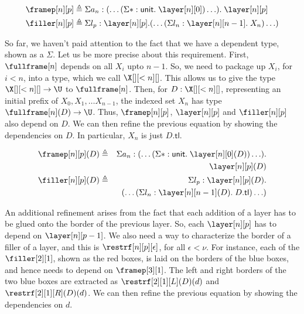 \documentclass[10pt]{art.cls/art}
\newcommand{\unittype}{\ensuremath{\mathsf{unit}}}
\newcommand{\unitpoint}{\ensuremath{\ast}}
\newcommand{\defeq}{\ensuremath{\triangleq}}
\newcommand{\tl}{\ensuremath{\mathsf{tl}}}
\begin{document}
\begin{align*}
  \framep[n][p] & \defeq \Sigma a_n : (\ldots (\Sigma \unitpoint : \unittype .\; \layer[n][0]) \ldots) .\; \layer[n][p] \\
  \filler[n][p] & \defeq \Sigma l_p : \layer[n][p] . (\ldots (\Sigma l_n : \layer[n][n - 1] .\; X_n) \ldots)
\end{align*}

So far, we haven't paid attention to the fact that we have a dependent type, shown as a $\Sigma$. Let us be more precise about this requirement. First, $\fullframe[n]$ depends on all $X_i$ upto $n - 1$. So, we need to package up $X_i$, for $i < n$, into a type, which we call $\X[][<n][]$. This allows us to give the type $\X[][<n][] \rightarrow \U$ to $\fullframe[n]$. Then, for $D: \X[][<n][]$, representing an initial prefix of $X_0, X_1, \ldots X_{n - 1}$, the indexed set $X_n$ has type $\fullframe[n](D) \rightarrow \U$. Thus, $\framep[n][p]$, $\layer[n][p]$ and $\filler[n][p]$ also depend on $D$. We can then refine the previous equation by showing the dependencies on $D$. In particular, $X_n$ is just $D.\tl$.

\begin{align*}
  \framep[n][p](D) & \defeq & \Sigma a_n : (\ldots (\Sigma \unitpoint : \unittype .\; \layer[n][0](D)) \ldots) . \\
                   &        & \layer[n][p](D)                                                                    \\
  \filler[n][p](D) & \defeq & \Sigma l_p : \layer[n][p](D) .                                                     \\
                   &        & (\ldots (\Sigma l_n : \layer[n][n - 1](D) .\; D.\tl) \ldots)
\end{align*}

An additional refinement arises from the fact that each addition of a layer has to be glued onto the border of the previous layer. So, each $\layer[n][p]$ has to depend on $\layer[n][p - 1]$. We also need a way to characterize the border of a filler of a layer, and this is $\restrf[n][p][\epsilon]$, for all $\epsilon < \nu$. For instance, each of the $\filler[2][1]$, shown as the red boxes, is laid on the borders of the blue boxes, and hence needs to depend on $\framep[3][1]$. The left and right borders of the two blue boxes are extracted as $\restrf[2][1][L](D)(d)$ and $\restrf[2][1][R](D)(d)$. We can then refine the previous equation by showing the dependencies on $d$.
\end{document}
